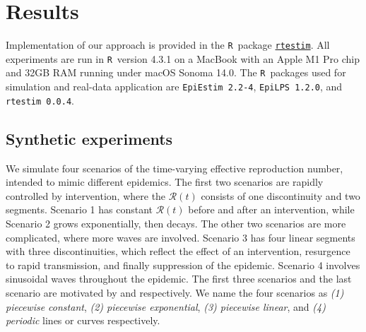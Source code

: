 \documentclass[10pt,letterpaper]{article}
\newcommand{\R}{\texttt{R}}
\def\calR{\mathcal{R}}
\begin{document}
\section{Results}

Implementation of our approach is provided in the \R\ package
\href{https://dajmcdon.github.io/rtestim/}{\texttt{rtestim}}. All experiments
are run in \R\ version 4.3.1 on a MacBook with an Apple M1 Pro chip
and 32GB RAM running under macOS Sonoma 14.0. The \R\ packages used for
simulation and real-data application are \texttt{EpiEstim 2.2-4},
\texttt{EpiLPS 1.2.0}, and \texttt{rtestim 0.0.4}. 

\subsection{Synthetic experiments}

We simulate four scenarios of the time-varying effective reproduction number,
intended to mimic different epidemics. The first two scenarios are rapidly controlled by intervention, where the $\calR(t)$ consists
of one discontinuity and two segments. Scenario 1 has constant $\calR(t)$ before
and after an intervention, while Scenario 2 grows exponentially, then decays.
The other two scenarios are more complicated, where more waves
are involved. Scenario 3 has four linear segments with three discontinuities,
which reflect the effect of an intervention, resurgence to rapid transmission,
and finally suppression of the epidemic. Scenario 4 involves sinusoidal waves
throughout the epidemic.
The first three scenarios and the last scenario are motivated by
\cite{parag2021improved} and \cite{gressani2022epilps} respectively. 
We name the four scenarios as \textit{(1) piecewise constant}, \textit{(2) 
piecewise exponential}, \textit{(3) piecewise linear}, and \textit{(4) periodic} 
lines or curves respectively. 
\end{document}
